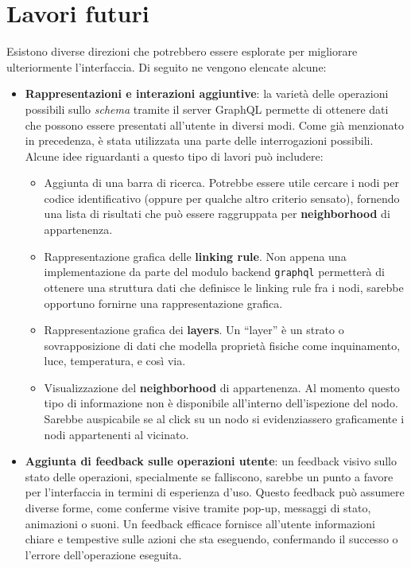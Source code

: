 \section{Lavori futuri}
Esistono diverse direzioni che potrebbero essere esplorate per migliorare ulteriormente l'interfaccia. Di seguito ne vengono elencate alcune:

\begin{itemize}
	\item \textbf{Rappresentazioni e interazioni aggiuntive}: la varietà delle operazioni possibili sullo \textit{schema} tramite il server GraphQL permette di ottenere dati che possono essere presentati all'utente in diversi modi. Come già menzionato in precedenza, è stata utilizzata una parte delle interrogazioni possibili. Alcune idee riguardanti a questo tipo di lavori può includere:
	\begin{itemize}
		\item Aggiunta di una barra di ricerca. Potrebbe essere utile cercare i nodi per codice identificativo (oppure per qualche altro criterio sensato), fornendo una lista di risultati che può essere raggruppata per \textbf{neighborhood} di appartenenza.
		\item Rappresentazione grafica delle \textbf{linking rule}. Non appena una implementazione da parte del modulo backend \texttt{graphql} permetterà di ottenere una struttura dati che definisce le linking rule fra i nodi, sarebbe opportuno fornirne una rappresentazione grafica. 
		\item Rappresentazione grafica dei \textbf{layers}. Un ``layer'' è un strato o sovrapposizione di dati che modella proprietà fisiche come inquinamento, luce, temperatura, e così via. 
		\item Visualizzazione del \textbf{neighborhood} di appartenenza. Al momento questo tipo di informazione non è disponibile all'interno dell'ispezione del nodo. Sarebbe auspicabile se al click su un nodo si evidenziassero graficamente i nodi appartenenti al vicinato.
	\end{itemize}
	\item \textbf{Aggiunta di feedback sulle operazioni utente}: un feedback visivo sullo stato delle operazioni, specialmente se falliscono, sarebbe un punto a favore per l'interfaccia in termini di esperienza d'uso. Questo feedback può assumere diverse forme, come conferme visive tramite pop-up, messaggi di stato, animazioni o suoni. Un feedback efficace fornisce all'utente informazioni chiare e tempestive sulle azioni che sta eseguendo, confermando il successo o l'errore dell'operazione eseguita.

\end{itemize}
